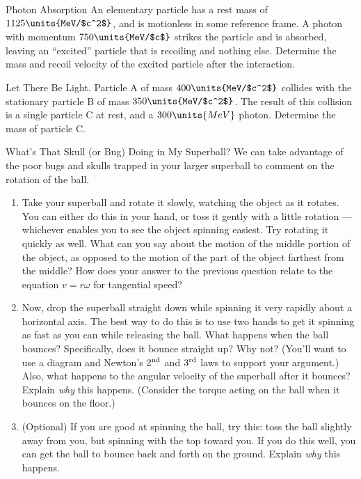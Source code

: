 \begin{aproblem}{Photon Absorption} 
  An elementary particle has a rest mass of \break $1125\units{MeV/$c^2$}$,
  and is motionless in some reference frame.  A photon with momentum
  $750\units{MeV/$c$}$ strikes the particle and is absorbed, leaving
  an ``excited'' particle that is recoiling and nothing else.
  Determine the mass and recoil velocity of the excited particle after
  the interaction.
  \label{prob:photon_absorption}
\end{aproblem}

\begin{aproblem}{Let There Be Light.}  
  Particle A of mass $400\units{MeV/$c^2$}$ collides with the
  stationary particle B of mass $350\units{MeV/$c^2$}$.  The result of
  this collision is a single particle C at rest, and a
  $300\units{MeV}$ photon.  Determine the mass of particle C.
  \label{prob:light}
\end{aproblem}


\begin{aproblem}{What's That Skull (or Bug) Doing in My Superball? }
  We can take advantage of the poor bugs and skulls trapped in your
  larger superball to comment on the rotation of the ball.
  \begin{enumerate}
  \item Take your superball and rotate it slowly, watching the object
    as it rotates.  You can either do this in your hand, or toss it
    gently with a little rotation --- whichever enables you to see the
    object spinning easiest.  Try rotating it quickly as well.  What
    can you say about the motion of the middle portion of the object,
    as opposed to the motion of the part of the object farthest from
    the middle?  How does your answer to the previous question relate
    to the equation $v = r\omega$ for tangential speed?

  \item Now, drop the superball straight down while spinning it very
    rapidly about a horizontal axis.  The best way to do this is to 
    use two hands to get it
    spinning as fast as you can while releasing the ball.  What
    happens when the ball bounces?  Specifically, does it bounce
    straight up?  Why not?  (You'll want to use a diagram and Newton's
    $2^{\rm nd}$ and $3^{\rm rd}$ laws to support your argument.)
    Also, what happens to the angular velocity of the superball after
    it bounces?  Explain {\em why} this happens.  (Consider the torque
    acting on the ball when it bounces on the floor.)

  \item (Optional) If you are good at spinning the ball, try this:
    toss the ball slightly away from you, but spinning with the top
    toward you.  If you do this well, you can get the ball to bounce
    back and forth on the ground.  Explain {\em why} this happens.

  \end{enumerate}
\end{aproblem}

